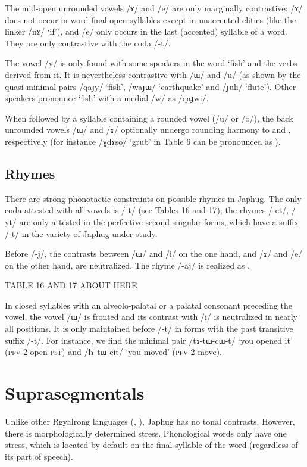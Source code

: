 \documentclass[12pt]{article}
\newcommand{\ipa}[1]{\mbox{\phon/#1/}}
\newcommand{\phonet}[1]{\mbox{\phon[#1]}}
\begin{document}
The mid-open unrounded vowels \ipa{ɤ} and \ipa{e} are only marginally contrastive: \ipa{ɤ} does not occur in word-final open syllables except in unaccented clitics (like the linker \ipa{nɤ} `if'), and \ipa{e} only occurs in the last (accented) syllable of a word. They are only contrastive with the coda \ipa{-t}.
     
The vowel \ipa{y} is only found with some speakers in the word `fish' and the verbs derived from it. It is nevertheless contrastive with \ipa{ɯ} and \ipa{u} (as shown by the quasi-minimal pairs \ipa{qaɟy} `fish', \ipa{waɟɯ} `earthquake' and \ipa{ɟuli} `flute'). Other speakers pronounce `fish' with a medial \ipa{w} as \ipa{qaɟwi}. 

When followed by a syllable containing a rounded vowel (\ipa{u} or \ipa{o}), the back unrounded vowels \ipa{ɯ} and \ipa{ɤ} optionally undergo rounding harmony to \phonet{u} and \phonet{o}, respectively (for instance \ipa{ɣdɤso} `grub' in Table 6 can be pronounced as  \phonet{ɣdoso}).
     
\subsection*{Rhymes}     \label{sec:rhymes}
     There are strong phonotactic constraints on possible rhymes in Japhug. The only coda attested with all  vowels is \ipa{-t} (see Tables 16 and 17); the rhymes \ipa{-et}, \ipa{-yt} are only attested in the perfective second singular forms, which have a suffix \ipa{-t} in the variety of Japhug under study.
 
Before \ipa{-j}, the contrasts between \ipa{ɯ} and \ipa{i} on the one hand, and \ipa{ɤ} and \ipa{e} on the other hand, are neutralized. The rhyme \ipa{-aj} is realized as \phonet{ɛj}.

TABLE 16 AND 17 ABOUT HERE

In closed syllables with an alveolo-palatal or a palatal consonant preceding the vowel, the vowel \ipa{ɯ} is fronted and its contrast with \ipa{i} is neutralized in nearly all positions. It is only maintained before \ipa{-t} in forms with the past transitive suffix  \ipa{-t}. For instance, we find the minimal pair \ipa{tɤ-tɯ-cɯ-t} `you opened it' (\textsc{pfv}-2-open-\textsc{pst}) and \ipa{lɤ-tɯ-cit} `you moved' (\textsc{pfv}-2-move).
    
     \section*{Suprasegmentals}
Unlike other Rgyalrong languages (\citealt{jackson05yingao}, \citealt{linyj12tone}), Japhug has no tonal contrasts. However, there is morphologically determined stress. Phonological words only have one stress, which is located by default on the final syllable of the word (regardless of its part of speech).
\end{document}
